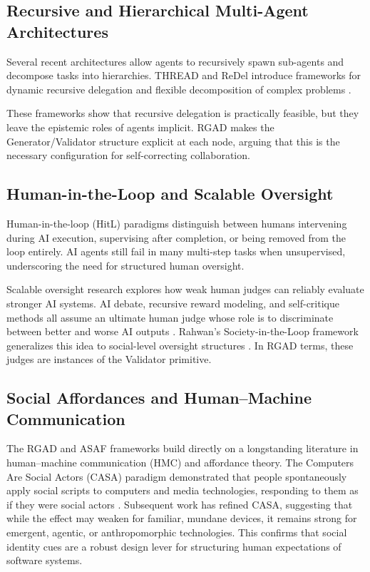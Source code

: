 \documentclass[11pt,a4paper]{article}
\begin{document}
\subsection{Recursive and Hierarchical Multi-Agent Architectures}
Several recent architectures allow agents to recursively spawn sub-agents and decompose tasks into hierarchies. THREAD and ReDel introduce frameworks for dynamic recursive delegation and flexible decomposition of complex problems \citep{zhu2024thread, zhu2024redel}.

These frameworks show that recursive delegation is practically feasible, but they leave the epistemic roles of agents implicit. RGAD makes the Generator/Validator structure explicit at each node, arguing that this is the necessary configuration for self-correcting collaboration.

\subsection{Human-in-the-Loop and Scalable Oversight}
Human-in-the-loop (HitL) paradigms distinguish between humans intervening during AI execution, supervising after completion, or being removed from the loop entirely. AI agents still fail in many multi-step tasks when unsupervised, underscoring the need for structured human oversight.

Scalable oversight research explores how weak human judges can reliably evaluate stronger AI systems. AI debate, recursive reward modeling, and self-critique methods all assume an ultimate human judge whose role is to discriminate between better and worse AI outputs \citep{irving2018}. Rahwan's Society-in-the-Loop framework generalizes this idea to social-level oversight structures \citep{rahwan2017}. In RGAD terms, these judges are instances of the Validator primitive.

\subsection{Social Affordances and Human--Machine Communication}
The RGAD and ASAF frameworks build directly on a longstanding literature in human--machine communication (HMC) and affordance theory. The Computers Are Social Actors (CASA) paradigm demonstrated that people spontaneously apply social scripts to computers and media technologies, responding to them as if they were social actors \citep{reeves1996}. Subsequent work has refined CASA, suggesting that while the effect may weaken for familiar, mundane devices, it remains strong for emergent, agentic, or anthropomorphic technologies. This confirms that social identity cues are a robust design lever for structuring human expectations of software systems.
\end{document}
